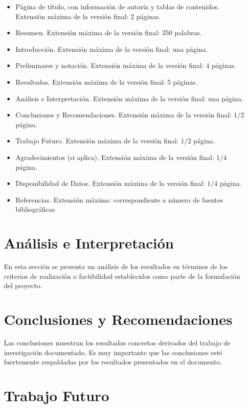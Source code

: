 \documentclass[peerreview]{IEEEtran}
\begin{document}
\begin{itemize}
\item P\'agina de t\'itulo, con informaci\'on de autor\'ia y tablas de contenidos. Extensi\'on m\'axima de la versi\'on final: 2 p\'aginas.
\item Resumen. Extensi\'on m\'axima de la versi\'on final: 350 palabras.
\item Introducci\'on. Extensi\'on m\'axima de la versi\'on final: una p\'agina.
\item Preliminares y notaci\'on. Extensi\'on m\'axima de la versi\'on final: 4 p\'aginas.
\item Resultados. Extensi\'on m\'axima de la versi\'on final: 5 p\'aginas.
\item An\'alisis e Interpretaci\'on. Extensi\'on m\'axima de la versi\'on final: una p\'agina.
\item Conclusiones y Recomendaciones. Extensi\'on m\'axima de la versi\'on final: $1/2$ p\'agina.
\item Trabajo Futuro. Extensi\'on m\'axima de la versi\'on final: $1/2$ p\'agina.
\item Agradecimientos (si aplica). Extensi\'on m\'axima de la versi\'on final: $1/4$ p\'agina.
\item Disponibilidad de Datos. Extensi\'on m\'axima de la versi\'on final: $1/4$ p\'agina.
\item Referencias. Extensi\'on m\'axima: correspondiente a n\'umero de fuentes bibliogr\'aficas.
\end{itemize}



\section{An\'alisis e Interpretaci\'on}
En esta secci\'on se presenta un an\'alisis de los resultados en t\'erminos de los criterios de realizaci\'on o factibilidad establecidos como parte de la formulaci\'on del proyecto.

\section{Conclusiones y Recomendaciones}
Las conclusiones muestran los resultados concretos derivados del trabajo de investigaci\'on documentado. Es muy importante que las conclusiones est\'e fuertemente respaldadas por los resultados presentados en el documento.

\section{Trabajo Futuro}
\end{document}
